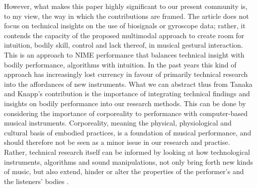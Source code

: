 However, what makes this paper highly significant to our present community is, to my view, the way in which the contributions are framed. The article does not focus on technical insights on the use of biosignals or gyroscope data; rather, it contends the capacity of the proposed multimodal approach to create room for intuition, bodily skill, control and lack thereof, in musical gestural interaction. This is an approach to NIME performance that balances technical insight with bodily performance, algorithms with intuition. In the past years this kind of approach has increasingly lost currency in favour of primarily technical research into the affordances of new instruments. What we can abstract thus from Tanaka and Knapp's contribution is the importance of integrating technical findings and insights on bodily performance into our research methods. This can be done by considering the importance of corporeality to performance with computer-based musical instruments. Corporeality, meaning the physical, physiological and cultural basis of embodied practices, is a foundation of musical performance, and should therefore not be seen as a minor issue in our research and practise. Rather, technical research itself can be informed by looking at how technological instruments, algorithms and sound manipulations, not only bring forth new kinds of music, but also extend, hinder or alter the properties of the performer's and the listeners' bodies \cite{Hayles:1999,Henriques:2011}. 


